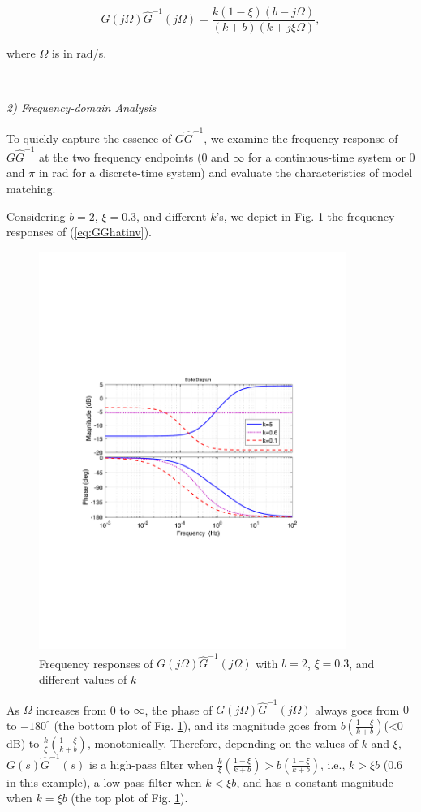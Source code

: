\documentclass [11pt, proquest] {uwthesis}[2020/02/24]
\begin{document}
\begin{equation}
G(j\Omega)\hat{G}^{-1}(j\Omega)=\frac{k(1-\xi)(b-j\Omega)}{(k+b)(k+j\xi\Omega)},\label{eq:GGhatinv}
\end{equation}

\noindent where $\Omega$ is in rad/s.

\

\noindent \emph{2) Frequency-domain Analysis}

To quickly capture the essence of $G\hat{G}^{-1}$, we examine the
frequency response of $G\hat{G}^{-1}$ at the two frequency endpoints
(0 and $\infty$ for a continuous-time system or 0 and $\pi$ in rad
for a discrete-time system) and evaluate the characteristics of model
matching.

Considering $b=2$, $\xi=0.3$, and different $k$'s, we depict in
Fig. \ref{fig:Nominal-model-inversion-2} the frequency responses
of (\ref{eq:GGhatinv}). 
\begin{figure}[!ht]
\begin{centering}
\includegraphics[width=10cm]{Model-inversion/Hinf}
\par\end{centering}
\caption{\label{fig:Nominal-model-inversion-2}Frequency responses of $G(j\Omega)\hat{G}^{-1}(j\Omega)$
with $b=2$, $\xi=0.3$, and different values of $k$}
\end{figure}
As $\Omega$ increases from 0 to $\infty$, the phase of $G(j\Omega)\hat{G}^{-1}(j\Omega)$
always goes from $0$ to $-180^{\circ}$ (the bottom plot of Fig.
\ref{fig:Nominal-model-inversion-2}), and its magnitude goes from
$b\left(\frac{1-\xi}{k+b}\right)$(<0 dB) to $\frac{k}{\xi}\left(\frac{1-\xi}{k+b}\right)$,
monotonically. Therefore, depending on the values of $k$ and $\xi$,
$G(s)\hat{G}^{-1}(s)$ is a high-pass filter when $\frac{k}{\xi}\left(\frac{1-\xi}{k+b}\right)>b\left(\frac{1-\xi}{k+b}\right)$,
i.e., $k>\xi b$ (0.6 in this example), a low-pass filter when $k<\xi b$,
and has a constant magnitude when $k=\xi b$ (the top plot of Fig.
\ref{fig:Nominal-model-inversion-2}).
\end{document}

